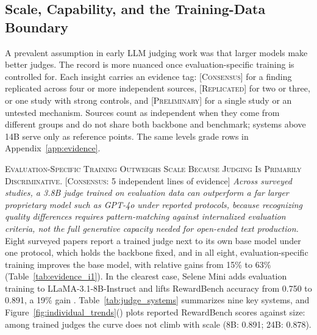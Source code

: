 \documentclass[11pt]{article}
\begin{document}
\subsection{Scale, Capability, and the Training-Data Boundary}

A prevalent assumption in early LLM judging work was that larger models make better judges. The record is more nuanced once evaluation-specific training is controlled for. Each insight carries an evidence tag: [\textsc{Consensus}] for a finding replicated across four or more independent sources, [\textsc{Replicated}] for two or three, or one study with strong controls, and [\textsc{Preliminary}] for a single study or an untested mechanism. Sources count as independent when they come from different groups and do not share both backbone and benchmark; systems above 14B serve only as reference points. The same levels grade rows in Appendix~\ref{app:evidence}.

\textsc{Evaluation-Specific Training Outweighs Scale Because Judging Is Primarily Discriminative.} [\textsc{Consensus}: 5 independent lines of evidence] \textit{Across surveyed studies, a 3.8B judge trained on evaluation data can outperform a far larger proprietary model such as GPT-4o under reported protocols, because recognizing quality differences requires pattern-matching against internalized evaluation criteria, not the full generative capacity needed for open-ended text production.} Eight surveyed papers report a trained judge next to its own base model under one protocol, which holds the backbone fixed, and in all eight, evaluation-specific training improves the base model, with relative gains from 15\% to 63\% (Table~\ref{tab:evidence_i1}). In the clearest case, Selene Mini adds evaluation training to LLaMA-3.1-8B-Instruct and lifts RewardBench accuracy from 0.750 to 0.891, a 19\% gain \citep{alexandru2025atla}. Table~\ref{tab:judge_systems} summarizes nine key systems, and Figure~\ref{fig:individual_trends}() plots reported RewardBench scores against size: among trained judges the curve does not climb with scale (8B: 0.891; 24B: 0.878).
\end{document}

